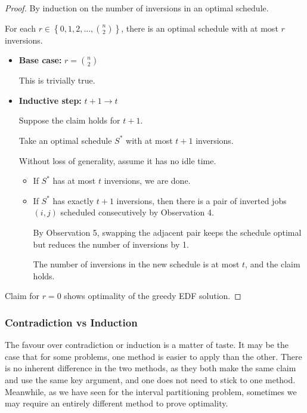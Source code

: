 \begin{proof}
    By induction on the number of inversions in an optimal schedule.

    \begin{claim}
        For each $r \in \left\{ 0, 1, 2, \dots, \binom{n}{2} \right\}$, there is an optimal schedule with at most $r$ inversions.
    \end{claim}

    \begin{itemize}
        \item \textbf{Base case:} $r = \binom{n}{2}$

        This is trivially true.

        \item \textbf{Inductive step:} $t + 1 \to t$

        Suppose the claim holds for $t + 1$.

        Take an optimal schedule $S^*$ with at most $t + 1$ inversions.

        Without loss of generality, assume it has no idle time.

        \begin{itemize}
            \item If $S^*$ has at most $t$ inversions, we are done.

            \item If $S^*$ has exactly $t + 1$ inversions, then there is a pair of inverted jobs $(i, j)$ scheduled consecutively by Observation 4.

            By Observation 5, swapping the adjacent pair keeps the schedule optimal but reduces the number of inversions by 1.

            The number of inversions in the new schedule is at most $t$, and the claim holds.
        \end{itemize}
    \end{itemize}

    Claim for $r = 0$ shows optimality of the greedy EDF solution.
\end{proof}

\subsubsection{Contradiction vs Induction}

The favour over contradiction or induction is a matter of taste. It may be the case that for some problems, one method is easier to apply than the other. There is no inherent difference in the two methods, as they both make the same claim and use the same key argument, and one does not need to stick to one method. Meanwhile, as we have seen for the interval partitioning problem, sometimes we may require an entirely different method to prove optimality.
